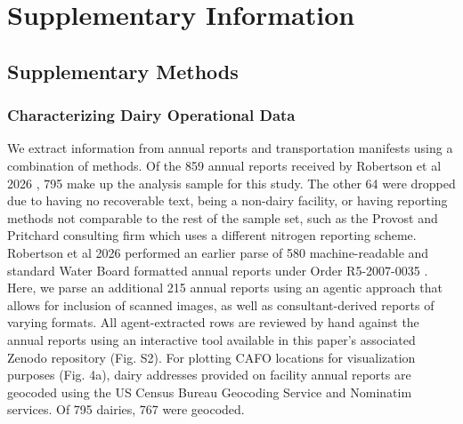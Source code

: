 \documentclass{iopjournal}
\begin{document}





\clearpage
\setcounter{section}{0}
\setcounter{subsection}{0}
\setcounter{subsubsection}{0}
\setcounter{figure}{0}
\renewcommand{\thefigure}{S\arabic{figure}}

\section*{Supplementary Information}
\subsection{Supplementary Methods}
\subsubsection{Characterizing Dairy Operational Data}
We extract information from annual reports and transportation manifests using a combination of methods. Of the 859 annual reports received by Robertson et al 2026 \cite{Robertson_2026}, 795 make up the analysis sample for this study. The other 64 were dropped due to having no recoverable text, being a non-dairy facility, or having reporting methods not comparable to the rest of the sample set, such as the Provost and Pritchard consulting firm which uses a different nitrogen reporting scheme. Robertson et al 2026 performed an earlier parse of 580 machine-readable and standard Water Board formatted annual reports under Order R5-2007-0035 \cite{Dairy_Order_2007}. Here, we parse an additional 215 annual reports using an agentic approach that allows for inclusion of scanned images, as well as consultant-derived reports of varying formats. All agent-extracted rows are reviewed by hand against the annual reports using an interactive tool available in this paper's associated Zenodo repository (Fig. S2). For plotting CAFO locations for visualization purposes (Fig. 4a), dairy addresses provided on facility annual reports are geocoded using the US Census Bureau Geocoding Service \cite{census_geocoder} and Nominatim \cite{nominatim} services. Of 795 dairies, 767 were geocoded.
\end{document}
